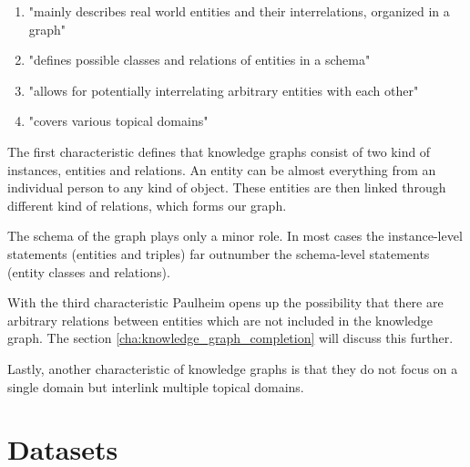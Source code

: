 \begin{enumerate}
\item "mainly describes real world entities and their interrelations, organized in a graph"
\item "defines possible classes and relations of entities
in a schema"
\item "allows for potentially interrelating arbitrary entities with each other"
\item "covers various topical domains"
\end{enumerate}

The first characteristic defines that knowledge graphs consist of two kind of instances, entities and relations. An entity can be almost everything from an individual person to any kind of object. These entities are then linked through different kind of relations, which forms our graph. 

The schema of the graph plays only a minor role. In most cases the instance-level statements (entities and triples) far outnumber the schema-level statements (entity classes and relations). 

With the third characteristic Paulheim opens up the possibility that there are arbitrary relations between entities which are not included in the knowledge graph. The section \ref{cha:knowledge_graph_completion} will discuss this further. 

Lastly, another characteristic of knowledge graphs is that they do not focus on a single domain but interlink multiple topical domains. 

\section{Datasets}
\label{cha:datasets}

